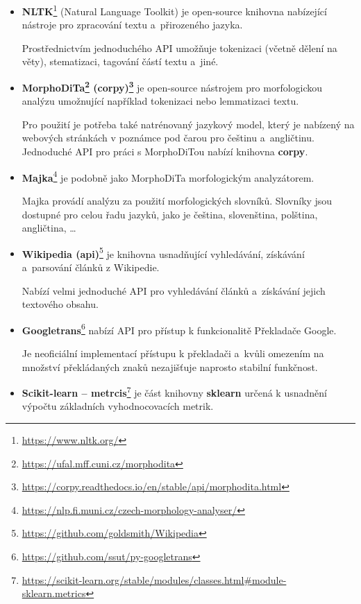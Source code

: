 \begin{itemize}
    \item \textbf{NLTK}\footnote{\url{https://www.nltk.org/}}
    (Natural Language Toolkit) je open-source knihovna nabízející nástroje pro zpracování textu a~přirozeného jazyka.\par Prostřednictvím jednoduchého API umožňuje tokenizaci (včetně dělení na věty), stematizaci, tagování částí textu a~jiné. 
    
    \item \textbf{MorphoDiTa\footnote{\url{https://ufal.mff.cuni.cz/morphodita}} (corpy)\footnote{\url{https://corpy.readthedocs.io/en/stable/api/morphodita.html}}}
    je open-source nástrojem pro morfologickou analýzu umožnující například tokenizaci nebo lemmatizaci textu.\par
    Pro použití je potřeba také natrénovaný jazykový model, který je nabízený na webových stránkách v poznámce pod čarou pro češtinu a~angličtinu. Jednoduché API pro práci s MorphoDiTou nabízí knihovna \textbf{corpy}.
    
    \item \textbf{Majka}\footnote{\url{https://nlp.fi.muni.cz/czech-morphology-analyser/}}
    je podobně jako MorphoDiTa morfologickým analyzátorem.\par Majka provádí analýzu za použití morfologických slovníků. Slovníky jsou dostupné pro celou řadu jazyků, jako je čeština, slovenština, polština, angličtina, \dots
    
    \item \textbf{Wikipedia (api)}\footnote{\url{https://github.com/goldsmith/Wikipedia}}
    je knihovna usnadňující vyhledávání, získávání a~parsování článků z Wikipedie. \par Nabízí velmi jednoduché API pro vyhledávání článků a~získávání jejich textového obsahu.
    
    \item \textbf{Googletrans}\footnote{\url{https://github.com/ssut/py-googletrans}}
    nabízí API pro přístup k funkcionalitě Překladače Google. \par
    Je neoficiální implementací přístupu k překladači a~kvůli omezením na množství překládaných znaků nezajišťuje naprosto stabilní funkčnost.
    
    \item \textbf{Scikit-learn -- metrcis}\footnote{\url{https://scikit-learn.org/stable/modules/classes.html\#module-sklearn.metrics}} je část knihovny \textbf{sklearn} určená k usnadnění výpočtu základních vyhodnocovacích metrik.
    

\end{itemize}
